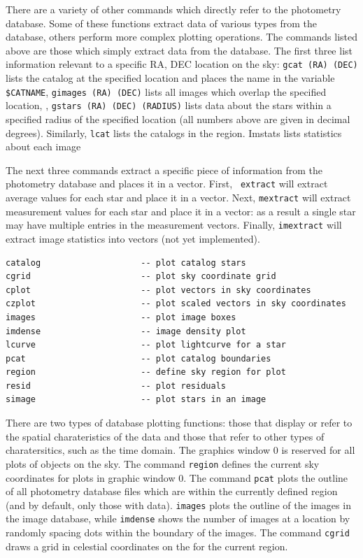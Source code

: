 \documentclass{article}
\begin{document}
There are a variety of other commands which directly refer to the
photometry database.  Some of these functions extract data of various
types from the database, others perform more complex plotting
operations.  The commands listed above are those which simply extract
data from the database.  The first three list information relevant to
a specific RA, DEC location on the sky: {\tt gcat (RA) (DEC)} lists
the catalog at the specified location and places the name in the
variable {\tt \$CATNAME}, {\tt gimages (RA) (DEC)} lists all images
which overlap the specified location, , {\tt gstars (RA) (DEC)
  (RADIUS)} lists data about the stars within a specified radius of
the specified location (all numbers above are given in decimal
degrees).  Similarly, {\tt lcat} lists the catalogs in the region.
Imstats lists statistics about each image

The next three commands extract a specific piece of information from
the photometry database and places it in a vector.  First, {\tt
  extract} will extract average values for each star and place it in a
vector.  Next, {\tt mextract} will extract measurement values for each
star and place it in a vector: as a result a single star may have
multiple entries in the measurement vectors.  Finally, {\tt imextract}
will extract image statistics into vectors (not yet implemented).


\begin{verbatim}
catalog                    -- plot catalog stars
cgrid                      -- plot sky coordinate grid
cplot                      -- plot vectors in sky coordinates
czplot                     -- plot scaled vectors in sky coordinates
images                     -- plot image boxes
imdense                    -- image density plot
lcurve                     -- plot lightcurve for a star
pcat                       -- plot catalog boundaries
region                     -- define sky region for plot
resid                      -- plot residuals
simage                     -- plot stars in an image
\end{verbatim}

There are two types of database plotting functions: those that display
or refer to the spatial charateristics of the data and those that
refer to other types of charatersitics, such as the time domain.  The
graphics window 0 is reserved for all plots of objects on the sky.
The command {\tt region} defines the current sky coordinates for plots
in graphic window 0.  The command {\tt pcat} plots the outline of all
photometry database files which are within the currently defined
region (and by default, only those with data).  {\tt images} plots the
outline of the images in the image database, while {\tt imdense} shows
the number of images at a location by randomly spacing dots within the
boundary of the images.  The command {\tt cgrid}
draws a grid in celestial coordinates on the for the current region.
\end{document}
